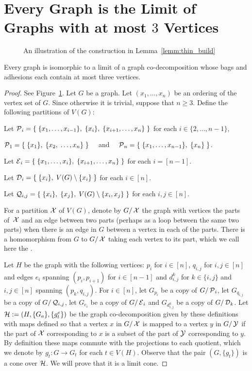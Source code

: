 \section{Every Graph is the Limit of Graphs with at most $3$ Vertices}\label{appendix: tree shape important}

\begin{figure}
    \centering
    \caption{An illustration of the construction in Lemma~\ref{lemm:thin_build}}
    \label{fig:graph_co}
\end{figure}


\begin{lemma}\label{lemm:thin_build}
    Every graph is isomorphic to a limit of a graph co-decomposition whose bags and adhesions each contain at most three vertices.
\end{lemma}
\begin{proof}
    See Figure~\ref{fig:graph_co}.
    Let $G$ be a graph. Let $(x_1,\ldots,x_n)$ be an ordering of the vertex set of $G$. Since otherwise it is trivial, suppose that $n\ge 3$. Define the following partitions of $V(G)$:
    
    Let $\operatorname{\mathcal{P}}_i=\{\;\{x_1,\ldots,x_{i-1}\},\;\{x_{i}\},\;\{x_{i+1},\ldots,x_n\}\;\}$ for each $i\in\{2,\ldots,n-1\}$,
    
    $\operatorname{\mathcal{P}}_1=\{\;\{x_1\},\;\{x_{2},\;\ldots,x_n\}\;\}\quad$ and $\quad\operatorname{\mathcal{P}}_n=\{\;\{x_1,\ldots,x_{n-1}\},\;\{x_{n}\}\;\}$.
    
    Let $\operatorname{\mathcal{E}}_i=\{\;\{x_1,\ldots,x_{i}\},\;\{x_{i+1},\ldots,x_n\}\;\}$ for each $i=[n-1]$.
    
    Let $\operatorname{\mathcal{D}}_i=\{\;\{x_i\},\; V(G)\setminus\{x_{i}\}\;\}$ for each $i\in[n]$.
    
    Let $\operatorname{\mathcal{Q}}_{i,j}=\{\;\{x_i\},\;\{x_j\},\; V(G)\setminus\{x_i,x_j\}\;\}$ for each $i,j\in[n]$.
    
    \noindent For a partition $\operatorname{\mathcal{X}}$ of $V(G)$, denote by $G/\operatorname{\mathcal{X}}$ the graph with vertices the parts of~$\operatorname{\mathcal{X}}$ and an edge between two parts (perhaps as a loop between the same two parts) when there is an edge in $G$ between a vertex in each of the parts. There is a homomorphism from $G$ to $G/\operatorname{\mathcal{X}}$ taking each vertex to its part, which we call here the .

    Let $H$ be the graph with the following vertices: $p_i$ for $i\in[n]$, $q_{i,j}$ for $i,j\in[n]$ and edges $e_i$ spanning $(p_i,p_{i+1})$ for $i\in[n-1]$ and $d_{i,j}^k$ for $k\in\{i,j\}$ and $i,j\in[n]$ spanning $(p_k,q_{i,j})$. For $i\in [n]$, let $G_{p_i}$ be a copy of $G/\operatorname{\mathcal{P}}_i$, let $G_{q_{i,j}}$ be a copy of $G/\operatorname{\mathcal{Q}}_{i,j}$, let $G_{e_i}$ be a copy of $G/\operatorname{\mathcal{E}}_i$ and $G_{d_{i,j}^k}$ be a copy of $G/\operatorname{\mathcal{D}}_k$. Let $\operatorname{\mathcal{H}}:=(H,\{G_a\},\{g_t^e\})$ be the graph co-decomposition given by these definitions with maps defined so that a vertex $x$ in $G/\operatorname{\mathcal{X}}$ is mapped to a vertex $y$ in $G/\operatorname{\mathcal{Y}}$ if the part of $\operatorname{\mathcal{X}}$ corresponding to $x$ is a subset of the part of $\operatorname{\mathcal{Y}}$ corresponding to $y$. By definition these maps commute with the projections to each quotient, which we denote by $g_t:G\rightarrow G_t$ for each $t\in V(H)$. Observe that the pair $(G,\{g_t\})$ is a cone over $\operatorname{\mathcal{H}}$. We will prove that it is a limit cone.


\end{proof}
